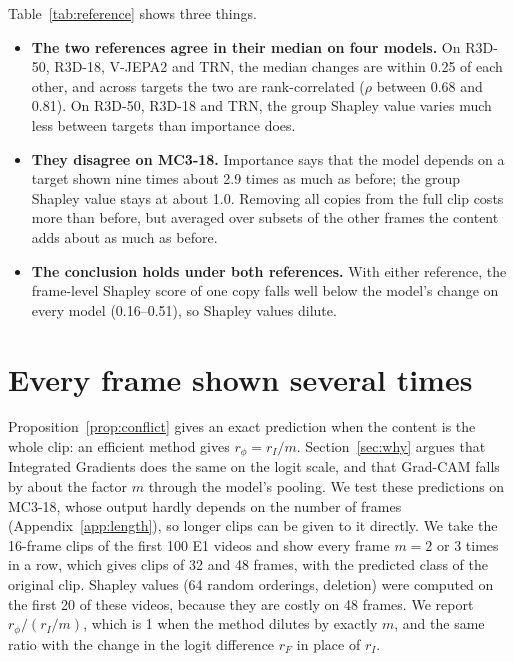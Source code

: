 Table~\ref{tab:reference} shows three things.
\begin{itemize}
  \item \textbf{The two references agree in their median on four models.} On R3D-50, R3D-18, V-JEPA2 and TRN, the median changes are within 0.25 of each other, and across targets the two are rank-correlated ($\rho$ between 0.68 and 0.81). On R3D-50, R3D-18 and TRN, the group Shapley value varies much less between targets than importance does.
  \item \textbf{They disagree on MC3-18.} Importance says that the model depends on a target shown nine times about 2.9 times as much as before; the group Shapley value stays at about 1.0. Removing all copies from the full clip costs more than before, but averaged over subsets of the other frames the content adds about as much as before.
  \item \textbf{The conclusion holds under both references.} With either reference, the frame-level Shapley score of one copy falls well below the model's change on every model (0.16--0.51), so Shapley values dilute.
\end{itemize}

\section{Every frame shown several times}
\label{app:whole-repeat}


Proposition~\ref{prop:conflict} gives an exact prediction when the content is the whole clip: an efficient method gives $r_\phi = r_I / m$.
Section~\ref{sec:why} argues that Integrated Gradients does the same on the logit scale, and that Grad-CAM falls by about the factor $m$ through the model's pooling.
We test these predictions on MC3-18, whose output hardly depends on the number of frames (Appendix~\ref{app:length}), so longer clips can be given to it directly.
We take the 16-frame clips of the first 100 E1 videos and show every frame $m = 2$ or $3$ times in a row, which gives clips of 32 and 48 frames, with the predicted class of the original clip.
Shapley values (64 random orderings, deletion) were computed on the first 20 of these videos, because they are costly on 48 frames.
We report $r_\phi / (r_I / m)$, which is 1 when the method dilutes by exactly $m$, and the same ratio with the change in the logit difference $r_F$ in place of $r_I$.

